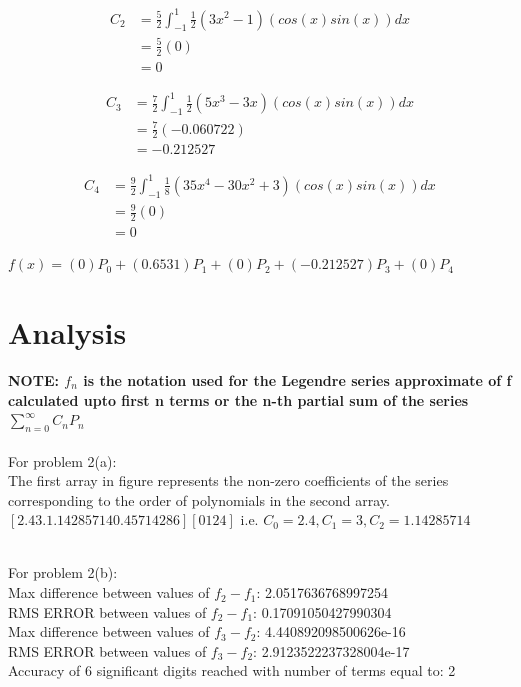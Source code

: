 \documentclass[12pt]{article}
\begin{document}
\begin{multicols}{2}
\begin{align*}
	C_2&=\frac{5}{2}\int_{-1}^{1}\frac{1}{2}(3x^2-1)(cos(x)sin(x))dx
\\
	&=\frac{5}{2}(0)
\\
	&= 0
\end{align*}

\begin{align*}
	C_3&=\frac{7}{2}\int_{-1}^{1}\frac{1}{2}(5x^3-3x)(cos(x)sin(x))dx
\\
	&=\frac{7}{2}(-0.060722)
\\
	&= -0.212527
\end{align*}

\begin{align*}
	C_4&=\frac{9}{2}\int_{-1}^{1}\frac{1}{8}(35x^4-30x^2+3)(cos(x)sin(x))dx
\\
	&=\frac{9}{2}(0)
\\
	&= 0
\end{align*}

\end{multicols}
$f(x)=(0)P_0+(0.6531)P_1+(0)P_2+(-0.212527)P_3+(0)P_4$\\
\section{Analysis}

\textbf{NOTE: $f_n$ is the notation used for the Legendre series approximate of f calculated upto first n terms or the n-th partial sum of the series $ \sum_{n=0}^{\infty} C_n P_n $}
\\
\noindent \\
For problem 2(a):\\
The first array in figure represents the non-zero coefficients of the series corresponding to the order of polynomials in the second array.
$[2.4        3.         1.14285714 0.45714286] [0 1 2 4]$
i.e. $C_0 = 2.4 , C_1 = 3 , C_2 = 1.14285714$

\noindent \\
For problem 2(b):\\
Max difference between values of $f_2-f_1$: 2.0517636768997254 \\
RMS ERROR between values of $f_2-f_1$: 0.17091050427990304 \\ 
Max difference between values of $f_3-f_2$: 4.440892098500626e-16 \\
RMS ERROR between values of $f_3-f_2$: 2.9123522237328004e-17 \\
Accuracy of 6 significant digits reached with number of terms equal to: 2 \\
\end{document}
